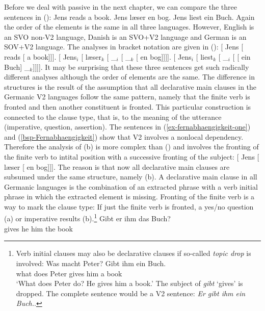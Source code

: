 Before we deal with passive in the next chapter, we can compare the three sentences in ():
\eal
\ex Jens reads a book.
\ex Jens læser en bog.
\ex Jens liest ein Buch.
\zl
Again the order of the elements is the same in all three languages. However, English is an SVO
non-V2 language, Danish is an SVO+V2 language and German is an SOV+V2 language. The analyses in
bracket notation are given in ():
\eal
\ex {}[ Jens [ reads [ a book]]].
\ex {}[ Jens$_i$ [ læser$_k$ [ \_$_i$ [  \_$_k$ [ en bog]]]].
\ex {}[ Jens$_i$ [ liest$_k$ [ \_$_i$ [\sub{\vbar} [ ein Buch] \_$_k$]]]].
\zl
It may be surprising that these three sentences get such radically different analyses although the
order of elements are the same. The difference in structures is the result of the assumption that
all declarative main clauses in the Germanic V2 languages follow the same pattern, namely that the
finite verb is fronted and then another constituent is fronted. This particular construction is
connected to the clause type, that is, to the meaning of the utterance (imperative, question,
assertion). The sentences in (\ref{ex-fernabhaengigkeit-one}) and (\ref{bsp-Fernabhaengigkeit}) show
that V2 involves a nonlocal dependency. Therefore the analysis
of (b) is more complex than () and involves the fronting of the finite verb to intital
position with a successive fronting of the subject:
\ea
{}[ Jens [ læser [ en bog]]].
\z
The reason is that now all declarative main clauses are subsumed under the same structure, namely
(b). A declarative main clause in all Germanic languages is the combination of an extracted
phrase with a verb initial phrase in which the extracted element is missing. Fronting of the finite
verb is a way to mark the clause type: If just the finite verb is fronted, a yes/no question (a)
or imperative results (b).\footnote{
  Verb initial clauses may also be declarative clauses if so-called \emph{topic drop} \citep{Fries88b} is involved:
  \ea
  \gll Was macht Peter? Gibt ihm ein Buch.\\
       what does Peter  gives him a book\\
  \glt `What does Peter do? He gives him a book.'
  \z
  The subject of \emph{gibt} `gives' is dropped. The complete sentence would be a V2 sentence:
  \emph{Er gibt ihm ein Buch.}.
}
\eal
\ex 
\gll Gibt er ihm das Buch?\\
     gives he him the book\\
